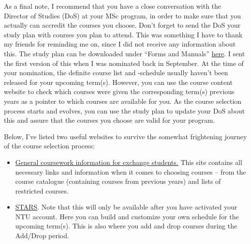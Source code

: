 As a final note, I recommend that you have a close conversation with the Director of Studies (DoS) at your MSc program, in order to make sure that you actually can accredit the courses you choose. Don't forget to send the DoS your study plan with courses you plan to attend. This was something I have to thank my friends for reminding me on, since I did not receive any information about this. The study plan can be downloaded under ``Forms and Manuals'' \href{https://www.chalmers.se/en/education/your-studies/exchange-studies-and-international-opportunities/exchange-studies/preparing-for-exchange-studies/}{here}. I sent the first version of this when I was nominated back in September. At the time of your nomination, the definite course list and -schedule usually haven't been released for your upcoming term(s). However, you can use the course content website to check which courses were given the corresponding term(s) previous years as a pointer to which courses are available for you. As the course selection process starts and evolves, you can use the study plan to update your DoS about this and assure that the courses you choose are valid for your program.

\hrulefill

Below, I've listed two useful websites to survive the somewhat frightening journey of the course selection process:
\begin{itemize}
    \item \href{https://gem.ntu.edu.sg/index.cfm?FuseAction=Programs.ViewProgramAngular&id=10006}{General coursework information for exchange students.} This site contains all necessary links and information when it comes to choosing courses -- from the course catalogue (containing courses from previous years) and lists of restricted courses.
    \item \href{https://wish.wis.ntu.edu.sg/pls/webexe/ldap_login.login?w_url=https://wish.wis.ntu.edu.sg/pls/webexe/aus_stars_planner.main}{STARS}. Note that this will only be available after you have activated your NTU account. Here you can build and customize your own schedule for the upcoming term(s). This is also where you add and drop courses during the Add/Drop period.
\end{itemize}
